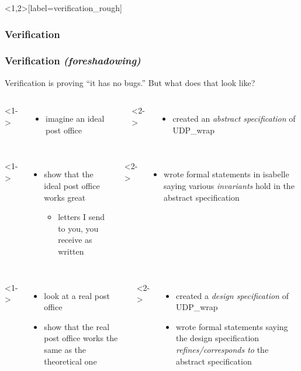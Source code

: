 \documentclass{beamer}
\begin{document}
\begin{frame}<1,2>[label=verification_rough]
\frametitle<1,3>{Verification}
\frametitle<2>{Verification \textit{(foreshadowing)}}

Verification is proving ``it has no bugs.''
But what does that look like?

    \begin{columns}[t]
        <1->
        \begin{itemize}
            \item imagine an ideal post office
        \end{itemize}
        <2->
        \begin{itemize}
            \item created an \alert<2>{\it abstract specification} of UDP\_wrap
        \end{itemize}
    \end{columns}
    
    \begin{columns}[t]
        <1->
        \begin{itemize}
            \item show that the ideal post office works great
            \begin{itemize}
                \item letters I send to you, you receive as written
            \end{itemize}
        \end{itemize}
        <2->
        \begin{itemize}
            \item wrote formal statements in isabelle saying various \alert<2>{\it invariants} hold in the abstract specification
        \end{itemize}
    \end{columns}

    \begin{columns}[t]
        <1->
        \begin{itemize}
            \item look at a real post office
            \vspace{\baselineskip}\\
            \item show that the real post office works the same as the theoretical one
        \end{itemize}
        
        <2->
        \begin{itemize}
            \item created a \alert<2>{\it design specification} of UDP\_wrap
            \item wrote formal statements saying the design specification \alert<2>{\it refines/corresponds to} the abstract specification
        \end{itemize}
    
    \end{columns}
    
\end{frame}
\end{document}
